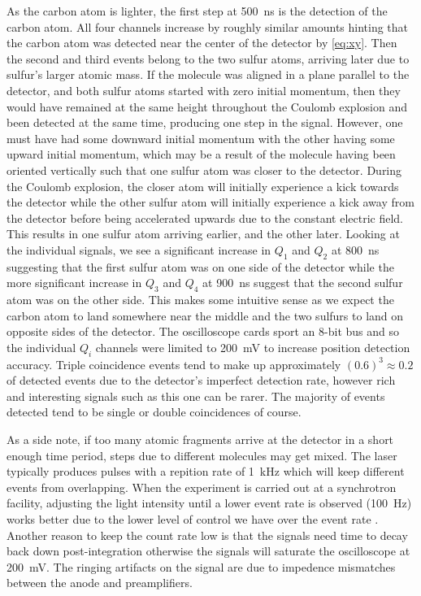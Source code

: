 As the carbon atom is lighter, the first step at \SI{500}{\ns} is the detection of the carbon atom. All four channels increase by roughly similar amounts hinting that the carbon atom was detected near the center of the detector by \eqref{eq:xy}. Then the second and third events belong to the two sulfur atoms, arriving later due to sulfur's larger atomic mass. If the molecule was aligned in a plane parallel to the detector, and both sulfur atoms started with zero initial momentum, then they would have remained at the same height throughout the Coulomb explosion and been detected at the same time, producing one step in the signal. However, one must have had some downward initial momentum with the other having some upward initial momentum, which may be a result of the molecule having been oriented vertically such that one sulfur atom was closer to the detector. During the Coulomb explosion, the closer atom will initially experience a kick towards the detector while the other sulfur atom will initially experience a kick away from the detector before being accelerated upwards due to the constant electric field. This results in one sulfur atom arriving earlier, and the other later. Looking at the individual signals, we see a significant increase in $Q_1$ and $Q_2$ at \SI{800}{\ns} suggesting that the first sulfur atom was on one side of the detector while the more significant increase in $Q_3$ and $Q_4$ at \SI{900}{\ns} suggest that the second sulfur atom was on the other side. This makes some intuitive sense as we expect the carbon atom to land somewhere near the middle and the two sulfurs to land on opposite sides of the detector. The oscilloscope cards sport an 8-bit bus and so the individual $Q_i$ channels were limited to \SI{200}{\mV} to increase position detection accuracy. Triple coincidence events tend to make up approximately $(0.6)^3 \approx 0.2$ of detected events due to the detector's imperfect detection rate, however rich and interesting signals such as this one can be rarer. The majority of events detected tend to be single or double coincidences of course.

As a side note, if too many atomic fragments arrive at the detector in a short enough time period, steps due to different molecules may get mixed. The laser typically produces pulses with a repition rate of \SI{1}{\kilo\Hz} which will keep different events from overlapping. When the experiment is carried out at a synchrotron facility, adjusting the light intensity until a lower event rate is observed (\SI{100}{\Hz}) works better due to the lower level of control we have over the event rate \citep{Ramadhan16}. Another reason to keep the count rate low is that the signals need time to decay back down post-integration otherwise the signals will saturate the oscilloscope at \SI{200}{\mV}. The ringing artifacts on the signal are due to impedence mismatches between the anode and preamplifiers.

